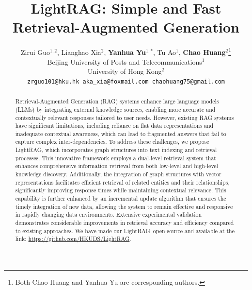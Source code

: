 \documentclass{article} %
\title{LightRAG: Simple and Fast \\ Retrieval-Augmented Generation}
\author{Zirui Guo$^{1,2}$, Lianghao Xia$^{2}$, \textbf{Yanhua Yu}$^{1,*}$, Tu Ao$^{1}$, \textbf{Chao Huang}$^{2}$\thanks{Both Chao Huang and Yanhua Yu are corresponding authors.} \\
Beijing University of Posts and Telecommunications$^1$ \\
University of Hong Kong$^2$ \\
\texttt{\small zrguo101@hku.hk\; aka\_xia@foxmail.com\; chaohuang75@gmail.com}
}
\def\model{LightRAG}
\begin{document}
\maketitle

\begin{abstract}
Retrieval-Augmented Generation (RAG) systems enhance large language models (LLMs) by integrating external knowledge sources, enabling more accurate and contextually relevant responses tailored to user needs. However, existing RAG systems have significant limitations, including reliance on flat data representations and inadequate contextual awareness, which can lead to fragmented answers that fail to capture complex inter-dependencies. To address these challenges, we propose \model, which incorporates graph structures into text indexing and retrieval processes. This innovative framework employs a dual-level retrieval system that enhances comprehensive information retrieval from both low-level and high-level knowledge discovery. Additionally, the integration of graph structures with vector representations facilitates efficient retrieval of related entities and their relationships, significantly improving response times while maintaining contextual relevance. This capability is further enhanced by an incremental update algorithm that ensures the timely integration of new data, allowing the system to remain effective and responsive in rapidly changing data environments. Extensive experimental validation demonstrates considerable improvements in retrieval accuracy and efficiency compared to existing approaches. We have made our \model\ open-source and available at the link: \textcolor{blue}{\url{https://github.com/HKUDS/LightRAG}}.
\end{abstract}



\vspace{-0.1in}

% 

% 
\vspace{-0.1in}

\vspace{-0.1in}


\clearpage




\clearpage

\end{document}
